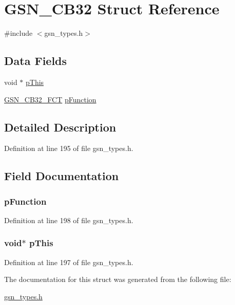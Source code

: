 \hypertarget{a00037}{
\section{GSN\_\-CB32 Struct Reference}
\label{a00037}
}


{\ttfamily \#include $<$gsn\_\-types.h$>$}

\subsection*{Data Fields}
\begin{DoxyCompactItemize}
\item 
void $\ast$ \hyperlink{a00037_a9603b95573753f229a989062644bdbc3}{pThis}
\item 
\hyperlink{a00599_ab4bad69dbb3955c389ce748612ed9ba4}{GSN\_\-CB32\_\-FCT} \hyperlink{a00037_ae7702782b34128a819502c51ea4f873d}{pFunction}
\end{DoxyCompactItemize}


\subsection{Detailed Description}


Definition at line 195 of file gsn\_\-types.h.



\subsection{Field Documentation}
\hypertarget{a00037_ae7702782b34128a819502c51ea4f873d}{
\subsubsection[{pFunction}]{ {\bf pFunction}}}
\label{a00037_ae7702782b34128a819502c51ea4f873d}


Definition at line 198 of file gsn\_\-types.h.

\hypertarget{a00037_a9603b95573753f229a989062644bdbc3}{
\subsubsection[{pThis}]{\setlength{\rightskip}{0pt plus 5cm}void$\ast$ {\bf pThis}}}
\label{a00037_a9603b95573753f229a989062644bdbc3}


Definition at line 197 of file gsn\_\-types.h.



The documentation for this struct was generated from the following file:\begin{DoxyCompactItemize}
\item 
\hyperlink{a00599}{gsn\_\-types.h}\end{DoxyCompactItemize}

